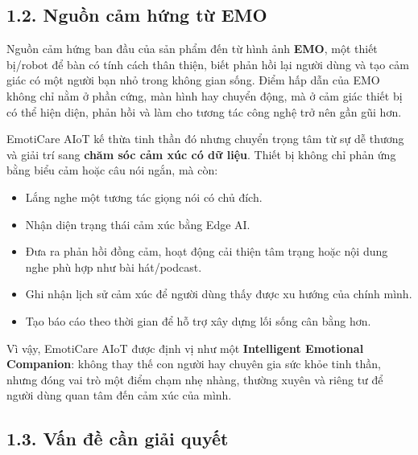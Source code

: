 \documentclass[12pt,a4paper]{article}
\begin{document}
\subsection*{1.2. Nguồn cảm hứng từ EMO}

Nguồn cảm hứng ban đầu của sản phẩm đến từ hình ảnh \textbf{EMO}, một thiết bị/robot để bàn có tính cách thân thiện, biết phản hồi lại người dùng và tạo cảm giác có một người bạn nhỏ trong không gian sống. Điểm hấp dẫn của EMO không chỉ nằm ở phần cứng, màn hình hay chuyển động, mà ở cảm giác thiết bị có thể hiện diện, phản hồi và làm cho tương tác công nghệ trở nên gần gũi hơn.


EmotiCare AIoT kế thừa tinh thần đó nhưng chuyển trọng tâm từ sự dễ thương và giải trí sang \textbf{chăm sóc cảm xúc có dữ liệu}. Thiết bị không chỉ phản ứng bằng biểu cảm hoặc câu nói ngắn, mà còn:


\begin{itemize}
\item Lắng nghe một tương tác giọng nói có chủ đích.
\item Nhận diện trạng thái cảm xúc bằng Edge AI.
\item Đưa ra phản hồi đồng cảm, hoạt động cải thiện tâm trạng hoặc nội dung nghe phù hợp như bài hát/podcast.
\item Ghi nhận lịch sử cảm xúc để người dùng thấy được xu hướng của chính mình.
\item Tạo báo cáo theo thời gian để hỗ trợ xây dựng lối sống cân bằng hơn.
\end{itemize}

Vì vậy, EmotiCare AIoT được định vị như một \textbf{Intelligent Emotional Companion}: không thay thế con người hay chuyên gia sức khỏe tinh thần, nhưng đóng vai trò một điểm chạm nhẹ nhàng, thường xuyên và riêng tư để người dùng quan tâm đến cảm xúc của mình.


\subsection*{1.3. Vấn đề cần giải quyết}
\end{document}
